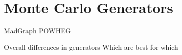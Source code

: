 \section{Monte Carlo Generators}

MadGraph
POWHEG

Overall differences in generators
Which are best for which 

